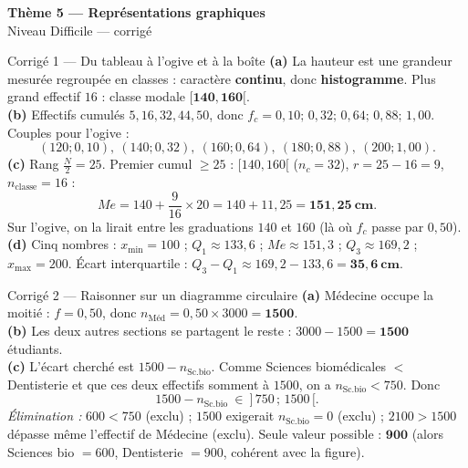 \documentclass[11pt,a4paper]{article}
\newcommand{\bandeau}[2]{%
\begin{tcolorbox}[boxbase,colback=primary,colframe=primarydark,halign=center,
   before skip=2pt,after skip=12pt]
{\LARGE\bfseries\color{white} #1}\\[3pt]{\normalsize\color{white} #2}
\end{tcolorbox}}
\newcommand{\med}{M\!e}
\begin{document}
\bandeau{Thème 5 — Représentations graphiques}{Niveau Difficile — corrigé}

\begin{corbox}{Corrigé 1 — Du tableau à l'ogive et à la boîte}
\textbf{(a)} La hauteur est une grandeur mesurée regroupée en classes : caractère \textbf{continu},
donc \textbf{histogramme}. Plus grand effectif $16$ : classe modale $\mathbf{[140,160[}$.\\[2pt]
\textbf{(b)} Effectifs cumulés $5,16,32,44,50$, donc $f_c=0{,}10;\,0{,}32;\,0{,}64;\,0{,}88;\,1{,}00$.
Couples pour l'ogive :
\[ (120;0{,}10),\ (140;0{,}32),\ (160;0{,}64),\ (180;0{,}88),\ (200;1{,}00). \]
\textbf{(c)} Rang $\tfrac{N}{2}=25$. Premier cumul $\geqslant25$ : $[140,160[$ ($n_c=32$),
$r=25-16=9$, $n_{\text{classe}}=16$ :
\[ \med=140+\frac{9}{16}\times20=140+11{,}25=\mathbf{151{,}25\ \text{cm}}. \]
Sur l'ogive, on la lirait entre les graduations $140$ et $160$ (là où $f_c$ passe par $0{,}50$).\\[2pt]
\textbf{(d)} Cinq nombres : $x_{\min}=100$ ; $Q_1\approx133{,}6$ ; $\med\approx151{,}3$ ;
$Q_3\approx169{,}2$ ; $x_{\max}=200$.
Écart interquartile : $Q_3-Q_1\approx169{,}2-133{,}6=\mathbf{35{,}6\ \text{cm}}$.
\end{corbox}

\begin{corbox}{Corrigé 2 — Raisonner sur un diagramme circulaire}
\textbf{(a)} Médecine occupe la moitié : $f=0{,}50$, donc $n_{\text{Méd}}=0{,}50\times3000=\mathbf{1500}$.\\[2pt]
\textbf{(b)} Les deux autres sections se partagent le reste : $3000-1500=\mathbf{1500}$ étudiants.\\[2pt]
\textbf{(c)} L'écart cherché est $1500-n_{\text{Sc.bio}}$. Comme Sciences biomédicales $<$ Dentisterie
et que ces deux effectifs somment à $1500$, on a $n_{\text{Sc.bio}}<750$. Donc
\[ 1500-n_{\text{Sc.bio}}\ \in\ ]\,750\,;\,1500\,[. \]
\emph{Élimination :} $600<750$ (exclu) ; $1500$ exigerait $n_{\text{Sc.bio}}=0$ (exclu) ;
$2100>1500$ dépasse même l'effectif de Médecine (exclu). Seule valeur possible : $\mathbf{900}$
(alors Sciences bio $=600$, Dentisterie $=900$, cohérent avec la figure).
\end{corbox}
\end{document}
